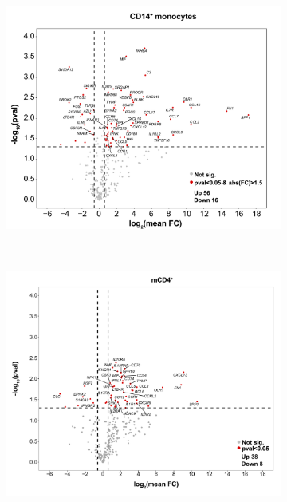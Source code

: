 \begin{figure}[htbp]
\centering
\begin{subfigure}{0.5\textwidth}
\centering
\includegraphics[width=\textwidth]{./Results3/pdfs/PSA_CD14_vulcano_plot_PCR_array_mean_FC}
\caption{\textbf{}}
\end{subfigure} \\
\begin{subfigure}{0.5\textwidth}
\centering
\includegraphics[width=\textwidth]{./Results3/pdfs/PSA_CD4_vulcano_plot_PCR_array_mean_FC}

\end{subfigure}
\end{figure}
